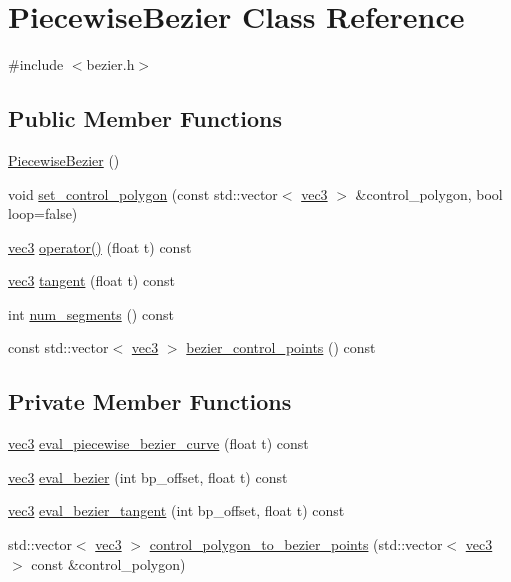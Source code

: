 \hypertarget{classPiecewiseBezier}{}\section{Piecewise\+Bezier Class Reference}
\label{classPiecewiseBezier}


{\ttfamily \#include $<$bezier.\+h$>$}

\subsection*{Public Member Functions}
\begin{DoxyCompactItemize}
\item 
\hyperlink{classPiecewiseBezier_ab8676451478fb74e19d8593cbcad0bbb}{Piecewise\+Bezier} ()
\item 
void \hyperlink{classPiecewiseBezier_a2cd325c11ab72464a8417dd9fe97e948}{set\+\_\+control\+\_\+polygon} (const std\+::vector$<$ \hyperlink{classvec3}{vec3} $>$ \&control\+\_\+polygon, bool loop=false)
\item 
\hyperlink{classvec3}{vec3} \hyperlink{classPiecewiseBezier_a1c874dfcaba9da134e230c71b37e8cb3}{operator()} (float t) const 
\item 
\hyperlink{classvec3}{vec3} \hyperlink{classPiecewiseBezier_a46e8a8d04d7fdd22b662204419c21273}{tangent} (float t) const 
\item 
int \hyperlink{classPiecewiseBezier_a7457500c14e29ee35b4a7cb067d6bae5}{num\+\_\+segments} () const 
\item 
const std\+::vector$<$ \hyperlink{classvec3}{vec3} $>$ \hyperlink{classPiecewiseBezier_a18490d36a394feea0def7e4df3f54d79}{bezier\+\_\+control\+\_\+points} () const 
\end{DoxyCompactItemize}
\subsection*{Private Member Functions}
\begin{DoxyCompactItemize}
\item 
\hyperlink{classvec3}{vec3} \hyperlink{classPiecewiseBezier_aa3f433f0483cfd5b9b937e4eaee9e52e}{eval\+\_\+piecewise\+\_\+bezier\+\_\+curve} (float t) const 
\item 
\hyperlink{classvec3}{vec3} \hyperlink{classPiecewiseBezier_ab8ef08d6d3c8f34e71a04cf130841913}{eval\+\_\+bezier} (int bp\+\_\+offset, float t) const 
\item 
\hyperlink{classvec3}{vec3} \hyperlink{classPiecewiseBezier_ad438e5d185f6e74f85ff84e0dd7d73cd}{eval\+\_\+bezier\+\_\+tangent} (int bp\+\_\+offset, float t) const 
\item 
std\+::vector$<$ \hyperlink{classvec3}{vec3} $>$ \hyperlink{classPiecewiseBezier_a7c05af0ba43e9c2459fbb502b078676d}{control\+\_\+polygon\+\_\+to\+\_\+bezier\+\_\+points} (std\+::vector$<$ \hyperlink{classvec3}{vec3} $>$ const \&control\+\_\+polygon)
\end{DoxyCompactItemize}
